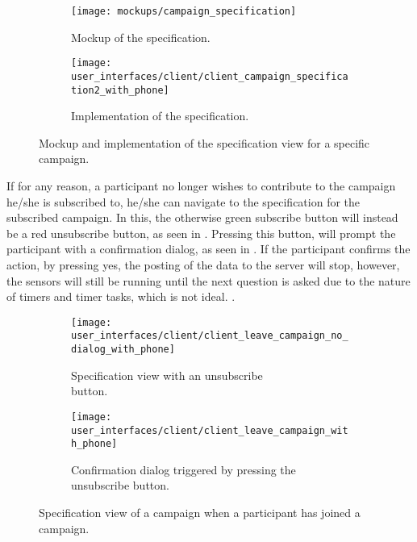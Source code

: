 \begin{figure}[!htbp]
    \begin{subfigure}[!t]{.48\textwidth}
        \centering
        \texttt{[image: mockups/campaign\_specification]}
        \caption{Mockup of the specification.}
        \label{fig:mockup_campaign_specification}
    \end{subfigure}%
    \begin{subfigure}[!t]{.52\textwidth}
        \centering
        \texttt{[image: user\_interfaces/client/client\_campaign\_specification2\_with\_phone]}
        \caption{Implementation of the specification.}
        \label{fig:implementation_campaign_specification}
    \end{subfigure}
    \caption{Mockup and implementation of the specification view for a specific campaign.}
    \label{fig:campaign_specification}
\end{figure}
\FloatBarrier

If for any reason, a participant no longer wishes to contribute to the campaign he/she is subscribed to, he/she can navigate to the specification for the subscribed campaign. In this, the otherwise green subscribe button will instead be a red unsubscribe button, as seen in . Pressing this button, will prompt the participant with a confirmation dialog, as seen in . If the participant confirms the action, by pressing yes, the posting of the data to the server will stop, however, the sensors will still be running until the next question is asked due to the nature of timers and timer tasks, which is not ideal.  . 


\begin{figure}[!htbp]
    \begin{subfigure}[!t]{.50\textwidth}
        \centering
        \texttt{[image: user\_interfaces/client/client\_leave\_campaign\_no\_dialog\_with\_phone]}
        \caption{Specification view with an unsubscribe \\\hspace{\textwidth}button.}
        \label{fig:leave_campaign_no_dialog}
    \end{subfigure}%
    \begin{subfigure}[!t]{.50\textwidth}
        \centering
        \texttt{[image: user\_interfaces/client/client\_leave\_campaign\_with\_phone]}
        \caption{Confirmation dialog triggered by pressing the unsubscribe button.}
        \label{fig:leave_campaign_dialog}
    \end{subfigure}
    \caption{Specification view of a campaign when a participant has joined a campaign.}
    \label{fig:leave_campaign}
\end{figure}
\FloatBarrier

